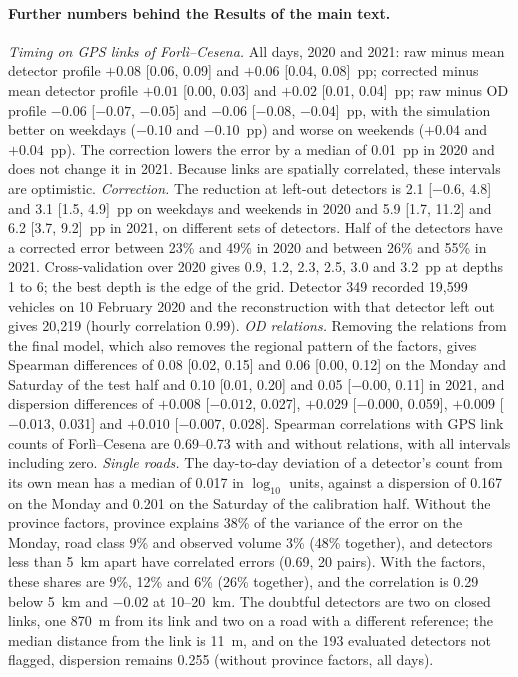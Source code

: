 \documentclass[11pt,a4paper]{article}
\begin{document}
\paragraph{Further numbers behind the Results of the main text.} \emph{Timing on GPS links of Forl\`i--Cesena.} All days, 2020 and 2021: raw minus mean detector profile $+0.08$ [0.06, 0.09] and $+0.06$ [0.04, 0.08]~pp; corrected minus mean detector profile $+0.01$ [0.00, 0.03] and $+0.02$ [0.01, 0.04]~pp; raw minus OD profile $-0.06$ [$-0.07$, $-0.05$] and $-0.06$ [$-0.08$, $-0.04$]~pp, with the simulation better on weekdays ($-0.10$ and $-0.10$~pp) and worse on weekends ($+0.04$ and $+0.04$~pp). The correction lowers the error by a median of 0.01~pp in 2020 and does not change it in 2021. Because links are spatially correlated, these intervals are optimistic. \emph{Correction.} The reduction at left-out detectors is 2.1 [$-0.6$, 4.8] and 3.1 [1.5, 4.9]~pp on weekdays and weekends in 2020 and 5.9 [1.7, 11.2] and 6.2 [3.7, 9.2]~pp in 2021, on different sets of detectors. Half of the detectors have a corrected error between 23\% and 49\% in 2020 and between 26\% and 55\% in 2021. Cross-validation over 2020 gives 0.9, 1.2, 2.3, 2.5, 3.0 and 3.2~pp at depths 1 to 6; the best depth is the edge of the grid. Detector 349 recorded 19,599 vehicles on 10 February 2020 and the reconstruction with that detector left out gives 20,219 (hourly correlation 0.99). \emph{OD relations.} Removing the relations from the final model, which also removes the regional pattern of the factors, gives Spearman differences of 0.08 [0.02, 0.15] and 0.06 [0.00, 0.12] on the Monday and Saturday of the test half and 0.10 [0.01, 0.20] and 0.05 [$-0.00$, 0.11] in 2021, and dispersion differences of $+0.008$ [$-0.012$, 0.027], $+0.029$ [$-0.000$, 0.059], $+0.009$ [$-0.013$, 0.031] and $+0.010$ [$-0.007$, 0.028]. Spearman correlations with GPS link counts of Forl\`i--Cesena are 0.69--0.73 with and without relations, with all intervals including zero. \emph{Single roads.} The day-to-day deviation of a detector's count from its own mean has a median of 0.017 in $\log_{10}$ units, against a dispersion of 0.167 on the Monday and 0.201 on the Saturday of the calibration half. Without the province factors, province explains 38\% of the variance of the error on the Monday, road class 9\% and observed volume 3\% (48\% together), and detectors less than 5~km apart have correlated errors (0.69, 20 pairs). With the factors, these shares are 9\%, 12\% and 6\% (26\% together), and the correlation is 0.29 below 5~km and $-0.02$ at 10--20~km. The doubtful detectors are two on closed links, one 870~m from its link and two on a road with a different reference; the median distance from the link is 11~m, and on the 193 evaluated detectors not flagged, dispersion remains 0.255 (without province factors, all days).
\end{document}
